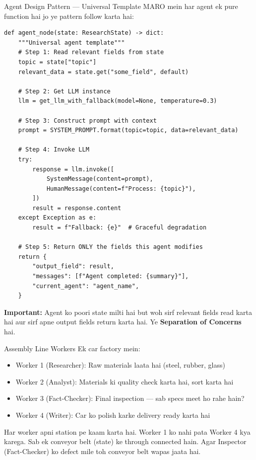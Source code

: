 \documentclass[11pt,a4paper,twoside]{report}
\begin{document}
\begin{conceptbox}{Agent Design Pattern --- Universal Template}
MARO mein har agent ek pure function hai jo ye pattern follow karta hai:

\begin{lstlisting}[style=pythonstyle]
def agent_node(state: ResearchState) -> dict:
    """Universal agent template"""
    # Step 1: Read relevant fields from state
    topic = state["topic"]
    relevant_data = state.get("some_field", default)

    # Step 2: Get LLM instance
    llm = get_llm_with_fallback(model=None, temperature=0.3)

    # Step 3: Construct prompt with context
    prompt = SYSTEM_PROMPT.format(topic=topic, data=relevant_data)

    # Step 4: Invoke LLM
    try:
        response = llm.invoke([
            SystemMessage(content=prompt),
            HumanMessage(content=f"Process: {topic}"),
        ])
        result = response.content
    except Exception as e:
        result = f"Fallback: {e}"  # Graceful degradation

    # Step 5: Return ONLY the fields this agent modifies
    return {
        "output_field": result,
        "messages": [f"Agent completed: {summary}"],
        "current_agent": "agent_name",
    }
\end{lstlisting}

\textbf{Important:} Agent ko poori state milti hai but woh sirf relevant fields read karta hai aur sirf apne output fields return karta hai. Ye \textbf{Separation of Concerns} hai.
\end{conceptbox}

\begin{analogy}{Assembly Line Workers}
Ek car factory mein:
\begin{itemize}
    \item Worker 1 (Researcher): Raw materials laata hai (steel, rubber, glass)
    \item Worker 2 (Analyst): Materials ki quality check karta hai, sort karta hai
    \item Worker 3 (Fact-Checker): Final inspection --- sab specs meet ho rahe hain?
    \item Worker 4 (Writer): Car ko polish karke delivery ready karta hai
\end{itemize}
Har worker apni station pe kaam karta hai. Worker 1 ko nahi pata Worker 4 kya karega. Sab ek conveyor belt (state) ke through connected hain. Agar Inspector (Fact-Checker) ko defect mile toh conveyor belt wapas jaata hai.
\end{analogy}
\end{document}
